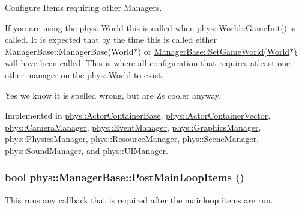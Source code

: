 Configure Items requiring other Managers. 

If you are using the \hyperlink{classphys_1_1World}{phys::World} this is called when \hyperlink{classphys_1_1World_a21cc36be08a61f40619584d4c438936b}{phys::World::GameInit()} is called. It is expected that by the time this is called either ManagerBase::ManagerBase(World$\ast$) or \hyperlink{classphys_1_1ManagerBase_a97eb1e77c1f7a0925fc623836368a262}{ManagerBase::SetGameWorld(World$\ast$)} will have been called. This is where all configuration that requires atleast one other manager on the \hyperlink{classphys_1_1World}{phys::World} to exist.\par
\par
 Yes we know it is spelled wrong, but are Zs cooler anyway. 

Implemented in \hyperlink{classphys_1_1ActorContainerBase_af36d5866e0ee9f6f450a4e62642e0928}{phys::ActorContainerBase}, \hyperlink{classphys_1_1ActorContainerVector_adcebf4329a587669f74e1eacc1e6912c}{phys::ActorContainerVector}, \hyperlink{classphys_1_1CameraManager_a5e956b61fa341ae576d8d160da518488}{phys::CameraManager}, \hyperlink{classphys_1_1EventManager_a51afdd83f44f461dfac5c9eca5883ea0}{phys::EventManager}, \hyperlink{classphys_1_1GraphicsManager_a554572de5d1cdce37aa1760d6e6e039c}{phys::GraphicsManager}, \hyperlink{classphys_1_1PhysicsManager_a28885be750bb763d957f122593815388}{phys::PhysicsManager}, \hyperlink{classphys_1_1ResourceManager_a9be3250f1f1153c9e079f82736eb00a8}{phys::ResourceManager}, \hyperlink{classphys_1_1SceneManager_aa13b380a4e38f706a1977237fc4b165e}{phys::SceneManager}, \hyperlink{classphys_1_1SoundManager_ae6d3957f965b54e06ec540e903cec68d}{phys::SoundManager}, and \hyperlink{classphys_1_1UIManager_af04e60c4f09c114ec3bf32babdb64ab7}{phys::UIManager}.

\hypertarget{classphys_1_1ManagerBase_afc3572602f96bdeb8215c386ff870820}{
\subsubsection[{PostMainLoopItems}]{\setlength{\rightskip}{0pt plus 5cm}bool phys::ManagerBase::PostMainLoopItems ()}}
\label{d2/de3/classphys_1_1ManagerBase_afc3572602f96bdeb8215c386ff870820}


This runs any callback that is required after the mainloop items are run. 

